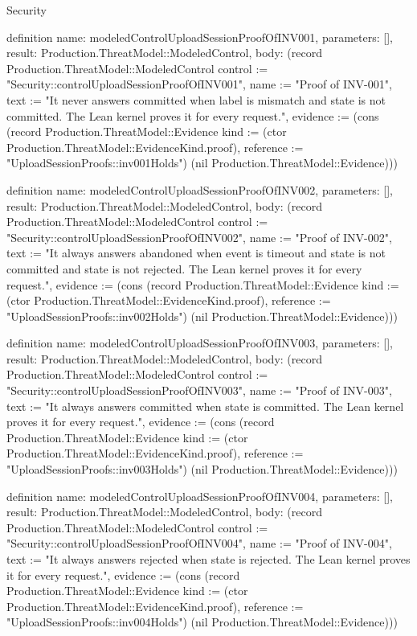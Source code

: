 \begin{lexlean}{Security}
\begin{semanticmodule}
definition{
  name: modeledControlUploadSessionProofOfINV001,
  parameters: [],
  result: Production.ThreatModel::ModeledControl,
  body: (record Production.ThreatModel::ModeledControl {control := "Security::controlUploadSessionProofOfINV001", name := "Proof of INV-001", text := "It never answers committed when label is mismatch and state is not committed. The Lean kernel proves it for every request.", evidence := (cons (record Production.ThreatModel::Evidence {kind := (ctor Production.ThreatModel::EvidenceKind.proof), reference := "UploadSessionProofs::inv001Holds"}) (nil Production.ThreatModel::Evidence))})
}

definition{
  name: modeledControlUploadSessionProofOfINV002,
  parameters: [],
  result: Production.ThreatModel::ModeledControl,
  body: (record Production.ThreatModel::ModeledControl {control := "Security::controlUploadSessionProofOfINV002", name := "Proof of INV-002", text := "It always answers abandoned when event is timeout and state is not committed and state is not rejected. The Lean kernel proves it for every request.", evidence := (cons (record Production.ThreatModel::Evidence {kind := (ctor Production.ThreatModel::EvidenceKind.proof), reference := "UploadSessionProofs::inv002Holds"}) (nil Production.ThreatModel::Evidence))})
}

definition{
  name: modeledControlUploadSessionProofOfINV003,
  parameters: [],
  result: Production.ThreatModel::ModeledControl,
  body: (record Production.ThreatModel::ModeledControl {control := "Security::controlUploadSessionProofOfINV003", name := "Proof of INV-003", text := "It always answers committed when state is committed. The Lean kernel proves it for every request.", evidence := (cons (record Production.ThreatModel::Evidence {kind := (ctor Production.ThreatModel::EvidenceKind.proof), reference := "UploadSessionProofs::inv003Holds"}) (nil Production.ThreatModel::Evidence))})
}

definition{
  name: modeledControlUploadSessionProofOfINV004,
  parameters: [],
  result: Production.ThreatModel::ModeledControl,
  body: (record Production.ThreatModel::ModeledControl {control := "Security::controlUploadSessionProofOfINV004", name := "Proof of INV-004", text := "It always answers rejected when state is rejected. The Lean kernel proves it for every request.", evidence := (cons (record Production.ThreatModel::Evidence {kind := (ctor Production.ThreatModel::EvidenceKind.proof), reference := "UploadSessionProofs::inv004Holds"}) (nil Production.ThreatModel::Evidence))})
}


\end{semanticmodule}
\end{lexlean}
